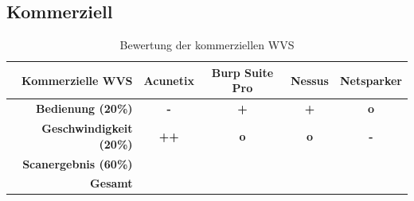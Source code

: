 \documentclass[12pt,oneside,a4paper,parskip]{scrbook}
\begin{document}
    \subsection{Kommerziell}
    \begin{table}[H]
      \centering
      \begin{tabular}{|r|c|c|c|c|}
      \hline
      \textbf{Kommerzielle WVS}       & \textbf{Acunetix} & \textbf{Burp Suite Pro} & \textbf{Nessus} & \textbf{Netsparker}  \\
      \hline
      \textbf{Bedienung (20\%)}       & \textbf{-}        & \textbf{+}              & \textbf{+}      & \textbf{o}           \\
      \hline
      \textbf{Geschwindigkeit (20\%)} & \textbf{++}       & \textbf{o}              & \textbf{o}      & \textbf{-}           \\
      \hline
      \textbf{Scanergebnis (60\%)}    &                   &                         &                 &                      \\
      \hline
      \textbf{Gesamt}                 &                   &                         &                 &                      \\
      \hline
      \end{tabular}
      \caption[Bewertung der kommerziellen WVS]{Bewertung der kommerziellen WVS}
    \end{table}
\end{document}
